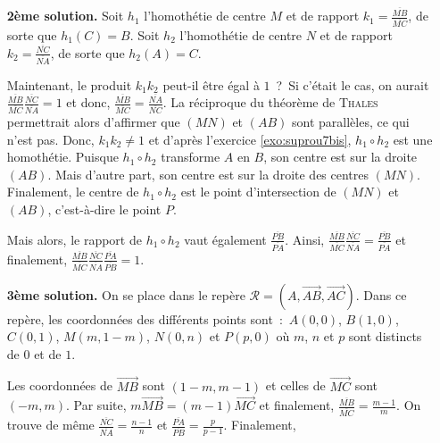 {{\begin{itemize}
et donc,

$$\frac{\overline{MB}}{\overline{MC}}.\frac{\overline{NC}}{\overline{NA}}.\frac{\overline{PA}}
{\overline{PB}}=\frac{\overline{MB}}{\overline{MC}}.\frac{\overline{MC}}{\overline{MA_1}}.\frac{\overline{MA_1}}
{\overline{MB}}=1.$$

\item[\textbf{2ème solution.}] Soit $h_1$ l'homothétie de centre $M$ et de rapport $k_1=\frac{\overline{MB}}{\overline{MC}}$, de sorte que $h_1(C)=B$. Soit $h_2$ l'homothétie de centre $N$ et de rapport $k_2=\frac{\overline{NC}}{\overline{NA}}$, de sorte que $h_2(A)=C$.

Maintenant, le produit $k_1k_2$ peut-il être égal à $1$~?~Si c'était le cas, on aurait $\frac{\overline{MB}}{\overline{MC}}\frac{\overline{NC}}{\overline{NA}}=1$ et donc, $\frac{\overline{MB}}{\overline{MC}}=\frac{\overline{NA}}{\overline{NC}}$. La réciproque du théorème de \textsc{Thales} permettrait alors d'affirmer que $(MN)$ et $(AB)$ sont parallèles, ce qui n'est pas. Donc, $k_1k_2\neq1$ et d'après l'exercice \ref{exo:suprou7bis}, $h_1\circ h_2$ est une homothétie. Puisque $h_1\circ h_2$ transforme $A$ en $B$, son centre est sur la droite $(AB)$. Mais d'autre part, son centre est sur la droite des centres $(MN)$. Finalement, le centre de $h_1\circ h_2$ est le point d'intersection de $(MN)$ et $(AB)$, c'est-à-dire le point $P$.

Mais alors, le rapport de $h_1\circ h_2$ vaut également $\frac{\overline{PB}}{\overline{PA}}$. Ainsi, 
$\frac{\overline{MB}}{\overline{MC}}\frac{\overline{NC}}{\overline{NA}}=\frac{\overline{PB}}{\overline{PA}}$ et finalement, $\frac{\overline{MB}}{\overline{MC}}\frac{\overline{NC}}{\overline{NA}}\frac{\overline{PA}}{\overline{PB}}=1$.

\item[\textbf{3ème solution.}] On se place dans le repère $\mathcal{R}=(A,\overrightarrow{AB},\overrightarrow{AC})$. Dans ce repère, les coordonnées des différents points sont~:~$A(0,0)$, $B(1,0)$, $C(0,1)$, $M(m,1-m)$, $N(0,n)$ et $P(p,0)$ où $m$, $n$ et $p$ sont distincts de $0$ et de $1$.

Les coordonnées de $\overrightarrow{MB}$ sont $(1-m,m-1)$ et celles de $\overrightarrow{MC}$ sont $(-m,m)$. Par suite, $m\overrightarrow{MB}=(m-1)\overrightarrow{MC}$ et finalement, $\frac{\overline{MB}}{\overline{MC}}=\frac{m-1}{m}$. On trouve de même $\frac{\overline{NC}}{\overline{NA}}=\frac{n-1}{n}$ et $\frac{\overline{PA}}{\overline{PB}}=\frac{p}{p-1}$. Finalement,


\end{itemize}}}
